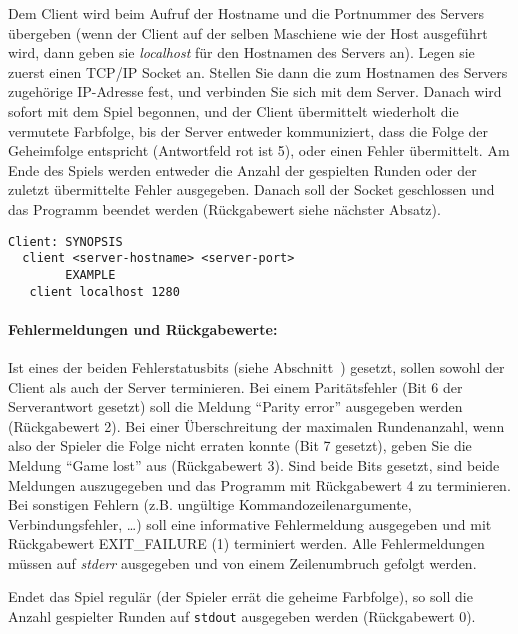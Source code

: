 \documentclass{article}
\begin{document}
Dem Client wird beim Aufruf der Hostname und die Portnummer des Servers
übergeben (wenn der Client auf der selben Maschiene wie der Host ausgeführt
wird, dann geben sie \emph{localhost} für den Hostnamen des Servers an). Legen
sie zuerst einen TCP/IP Socket an. Stellen Sie dann die zum Hostnamen des
Servers zugehörige IP-Adresse fest, und verbinden Sie sich mit dem Server.
Danach wird sofort mit dem Spiel begonnen, und der Client übermittelt
wiederholt die vermutete Farbfolge, bis der Server entweder kommuniziert, dass
die Folge der Geheimfolge entspricht (Antwortfeld rot ist 5), oder einen
Fehler übermittelt. Am Ende des Spiels werden entweder die Anzahl der
gespielten Runden oder der zuletzt übermittelte Fehler ausgegeben. Danach soll
der Socket geschlossen und das Programm beendet werden (Rückgabewert siehe
nächster Absatz).

\begin{verbatim}
Client: SYNOPSIS
  client <server-hostname> <server-port>
        EXAMPLE
   client localhost 1280
\end{verbatim}

\paragraph{Fehlermeldungen und Rückgabewerte:} Ist eines der beiden
Fehlerstatusbits (siehe Abschnitt~) gesetzt, sollen sowohl der
Client als auch der Server terminieren. Bei einem Parit\"atsfehler (Bit $6$
der Serverantwort gesetzt) soll die Meldung ``Parity error'' ausgegeben
werden (Rückgabewert 2). Bei einer Überschreitung der maximalen
Rundenanzahl, wenn also der Spieler die Folge nicht erraten konnte (Bit 7
gesetzt), geben Sie die Meldung ``Game lost'' aus (Rückgabewert 3). Sind beide Bits gesetzt, sind beide Meldungen auszugegeben und das
Programm mit Rückgabewert 4 zu terminieren. Bei sonstigen Fehlern (z.B.
ungültige Kommandozeilenargumente, Verbindungsfehler, \ldots) soll eine
informative Fehlermeldung ausgegeben und mit Rückgabewert EXIT\_FAILURE (1)
terminiert werden. Alle Fehlermeldungen müssen auf \emph{stderr} ausgegeben
und von einem Zeilenumbruch gefolgt werden.

Endet das Spiel regulär (der Spieler errät die geheime Farbfolge), so soll die
Anzahl gespielter Runden auf \texttt{stdout} ausgegeben werden (Rückgabewert
0).
\end{document}
